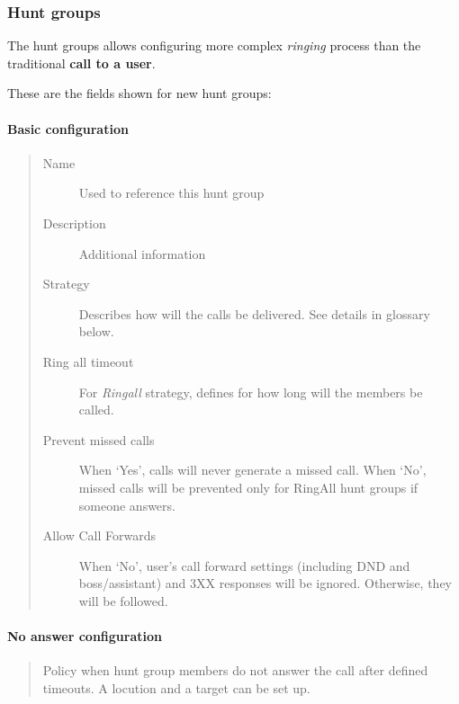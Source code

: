 \documentclass[letterpaper,10pt,spanish]{sphinxmanual}
\begin{document}
\subsubsection{Hunt groups}
\label{administration_portal/client/vpbx/routing_endpoints/hunt_groups:hunt-groups}\label{administration_portal/client/vpbx/routing_endpoints/hunt_groups::doc}\label{administration_portal/client/vpbx/routing_endpoints/hunt_groups:huntgroups}
The hunt groups allows configuring more complex \emph{ringing} process than the
traditional \textbf{call to a user}.

These are the fields shown for new hunt groups:


\paragraph{Basic configuration}
\label{administration_portal/client/vpbx/routing_endpoints/hunt_groups:basic-configuration}\begin{quote}
\begin{description}
\item[{Name}] \leavevmode
Used to reference this hunt group

\item[{Description}] \leavevmode
Additional information

\item[{Strategy}] \leavevmode
Describes how will the calls be delivered. See details in glossary below.

\item[{Ring all timeout}] \leavevmode
For \emph{Ringall} strategy, defines for how long will the members be called.

\item[{Prevent missed calls}] \leavevmode
When `Yes', calls will never generate a missed call. When `No', missed calls will be prevented only for RingAll
hunt groups if someone answers.

\item[{Allow Call Forwards}] \leavevmode
When `No', user's call forward settings (including DND and boss/assistant) and 3XX responses will be ignored. Otherwise, they will be followed.

\end{description}
\end{quote}


\paragraph{No answer configuration}
\label{administration_portal/client/vpbx/routing_endpoints/hunt_groups:no-answer-configuration}\begin{quote}

Policy when hunt group members do not answer the call after defined timeouts.
A locution and a target can be set up.
\end{quote}
\end{document}
